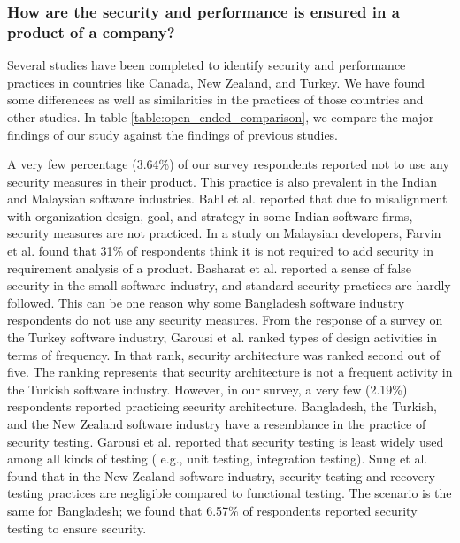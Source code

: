 \subsubsection{How are the security and performance is ensured in a product of a company?}

Several studies have been completed to identify security and performance practices in countries like Canada, New Zealand, and Turkey. We have found some differences as well as similarities in the practices of those countries and other studies.  In table \ref{table:open_ended_comparison}, we compare the major findings of our study against the findings of previous studies.


\label{security_comparison}
A very few percentage (3.64\%) of our survey respondents reported not to use any security measures in their product. This practice is also prevalent in the Indian and Malaysian software industries. Bahl et al.\cite{Bahl2011} reported that due to misalignment with organization design, goal, and strategy in some Indian software firms, security measures are not practiced. In a study on  Malaysian developers, Farvin et al.\cite{Farvin2016} found that 31\% of respondents think it is not required to add security in requirement analysis of a product. Basharat et al.\cite{Basharat2013} reported a sense of false security in the small software industry, and standard security practices are hardly followed. This can be one reason why some Bangladesh software industry respondents do not use any security measures.  From the response of a survey on the Turkey software industry, Garousi et al.\cite{Garousi2015} ranked types of design activities in terms of frequency. In that rank, security architecture was ranked second out of five. The ranking represents that security architecture is not a frequent activity in the Turkish software industry. However, in our survey, a very few (2.19\%) respondents reported practicing security architecture.  Bangladesh, the Turkish, and the New Zealand software industry have a resemblance in the practice of security testing. Garousi et al.\cite{Garousi2015} reported that security testing is least widely used among all kinds of testing ( e.g., unit testing, integration testing). Sung et al.\cite{Sung2006} found that in the New Zealand software industry, security testing and recovery testing practices are negligible compared to functional testing. The scenario is the same for Bangladesh; we found that 6.57\% of respondents reported security testing to ensure security.


